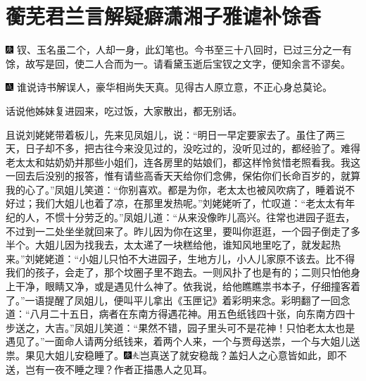 

\chapter{蘅芜君兰言解疑癖\hspace{.5em}潇湘子雅谑补馀香}

{\includegraphics[width=3mm]{../Images/00004}  \kaishu 钗、玉名虽二个，人却一身，此幻笔也。今书至三十八回时，已过三分之一有馀，故写是回，使二人合而为一。请看黛玉逝后宝钗之文字，便知余言不谬矣。}

{\includegraphics[width=3mm]{../Images/00005}  \kaishu 谁说诗书解误人，豪华相尚失天真。见得古人原立意，不正心身总莫论。}

话说他姊妹复进园来，吃过饭，大家散出，都无别话。

且说刘姥姥带着板儿，先来见凤姐儿，说：``明日一早定要家去了。虽住了两三天，日子却不多，把古往今来没见过的，没吃过的，没听见过的，都经验了。难得老太太和姑奶奶并那些小姐们，连各房里的姑娘们，都这样怜贫惜老照看我。我这一回去后没别的报答，惟有请些高香天天给你们念佛，保佑你们长命百岁的，就算我的心了。''凤姐儿笑道：``你别喜欢。都是为你，老太太也被风吹病了，睡着说不好过；我们大姐儿也着了凉，在那里发热呢。''刘姥姥听了，忙叹道：``老太太有年纪的人，不惯十分劳乏的。''凤姐儿道：``从来没像昨儿高兴。往常也进园子逛去，不过到一二处坐坐就回来了。昨儿因为你在这里，要叫你逛逛，一个园子倒走了多半个。大姐儿因为找我去，太太递了一块糕给他，谁知风地里吃了，就发起热来。''刘姥姥道：``小姐儿只怕不大进园子，生地方儿，小人儿家原不该去。比不得我们的孩子，会走了，那个坟圈子里不跑去。一则风扑了也是有的；二则只怕他身上干净，眼睛又净，或是遇见什么神了。依我说，给他瞧瞧祟书本子，仔细撞客着了。''一语提醒了凤姐儿，便叫平儿拿出《玉匣记》着彩明来念。彩明翻了一回念道：``八月二十五日，病者在东南方得遇花神。用五色纸钱四十张，向东南方四十步送之，大吉。''凤姐儿笑道：``果然不错，园子里头可不是花神！只怕老太太也是遇见了。''一面命人请两分纸钱来，着两个人来，一个与贾母送祟，一个与大姐儿送祟。果见大姐儿安稳睡了。{\includegraphics[width=3mm]{../Images/00004}\includegraphics[width=3mm]{../Images/00012}\footnotesize \kaishu 岂真送了就安稳哉？盖妇人之心意皆如此，即不送，岂有一夜不睡之理？作者正描愚人之见耳。}

